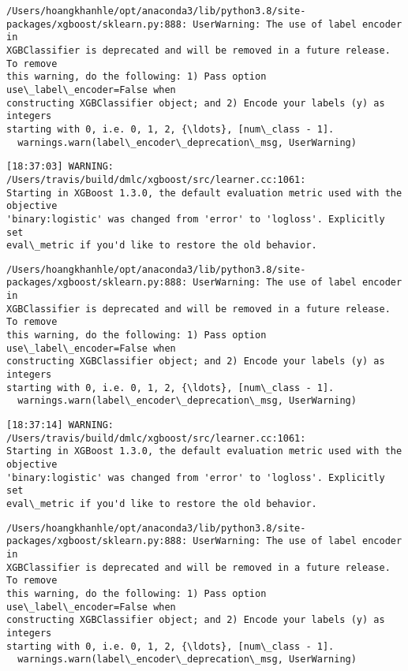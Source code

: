 \documentclass[11pt]{article}
\begin{document}
    \begin{Verbatim}[commandchars=\\\{\}]
/Users/hoangkhanhle/opt/anaconda3/lib/python3.8/site-
packages/xgboost/sklearn.py:888: UserWarning: The use of label encoder in
XGBClassifier is deprecated and will be removed in a future release. To remove
this warning, do the following: 1) Pass option use\_label\_encoder=False when
constructing XGBClassifier object; and 2) Encode your labels (y) as integers
starting with 0, i.e. 0, 1, 2, {\ldots}, [num\_class - 1].
  warnings.warn(label\_encoder\_deprecation\_msg, UserWarning)
    \end{Verbatim}

    \begin{Verbatim}[commandchars=\\\{\}]
[18:37:03] WARNING: /Users/travis/build/dmlc/xgboost/src/learner.cc:1061:
Starting in XGBoost 1.3.0, the default evaluation metric used with the objective
'binary:logistic' was changed from 'error' to 'logloss'. Explicitly set
eval\_metric if you'd like to restore the old behavior.
    \end{Verbatim}

    \begin{Verbatim}[commandchars=\\\{\}]
/Users/hoangkhanhle/opt/anaconda3/lib/python3.8/site-
packages/xgboost/sklearn.py:888: UserWarning: The use of label encoder in
XGBClassifier is deprecated and will be removed in a future release. To remove
this warning, do the following: 1) Pass option use\_label\_encoder=False when
constructing XGBClassifier object; and 2) Encode your labels (y) as integers
starting with 0, i.e. 0, 1, 2, {\ldots}, [num\_class - 1].
  warnings.warn(label\_encoder\_deprecation\_msg, UserWarning)
    \end{Verbatim}

    \begin{Verbatim}[commandchars=\\\{\}]
[18:37:14] WARNING: /Users/travis/build/dmlc/xgboost/src/learner.cc:1061:
Starting in XGBoost 1.3.0, the default evaluation metric used with the objective
'binary:logistic' was changed from 'error' to 'logloss'. Explicitly set
eval\_metric if you'd like to restore the old behavior.
    \end{Verbatim}

    \begin{Verbatim}[commandchars=\\\{\}]
/Users/hoangkhanhle/opt/anaconda3/lib/python3.8/site-
packages/xgboost/sklearn.py:888: UserWarning: The use of label encoder in
XGBClassifier is deprecated and will be removed in a future release. To remove
this warning, do the following: 1) Pass option use\_label\_encoder=False when
constructing XGBClassifier object; and 2) Encode your labels (y) as integers
starting with 0, i.e. 0, 1, 2, {\ldots}, [num\_class - 1].
  warnings.warn(label\_encoder\_deprecation\_msg, UserWarning)
    \end{Verbatim}
\end{document}
